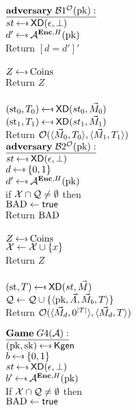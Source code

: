 \begin{figure}[tbhp]
\begin{center}
{
 {$\adversaryv{\;\advB1^{\mathcal{O}}(\pk)}$}\\
$st \getsr \mdalg(\epsilon,\bot)$\\
$d' \getsr \advA^{\encOracle,H}(\pk)$\\
Return $[d=d']'$\\ 

\\
  $Z \getsr \mathrm{Coins}$\\
  Return $Z$\\

\\
$(\st_0, \umd_0) \getsr \mdalg(st_0,\vmsg_0)$\\
$(\st_1, \umd_1) \getsr \mdalg(st_1,\vmsg_1)$\\
Return $\mathcal{O}(\langle \vec{M}_0,T_0\rangle, \langle \vec{M}_1,T_1\rangle)$\\
}
{
{$\adversaryv{\;\advB2^{\mathcal{O}}(\pk)}$}\\
$st \getsr \mdalg(\epsilon,\bot)$\\
$d \getsr \bits$\\ 
$d' \getsr \advA^{\encOracle,H}(\pk)$\\
if $\mathcal{X} \cap \mathcal{Q} \neq \emptyset$ then\\
\nudge $\mathrm{BAD}\gets\textsf{true}$\\
Return $\mathrm{BAD}$\\ 

\\
  $Z \getsr \mathrm{Coins}$\\
  $\mathcal{X} \gets \mathcal{X} \cup \{x\}$\\
  Return $Z$\\

\\
$(\st, \umd) \getsr \mdalg(st,\vmsg)$\\
$\mathcal{Q} \gets \mathcal{Q} \cup \{\langle \mathrm{pk},\vec{A},\vec{M}_b,T\rangle\}$\\
Return $\mathcal{O}(\langle \vec{M}_d,0^{|T|}\rangle, \langle \vec{M}_d,T\rangle)$\\
}
{
$\gamev{G4}{\advA}$\\
 $(\pk,\sk)\getsr\Kgen$\\
$ b \getsr \bits$\\
 $st \getsr \mdalg(\epsilon,\bot)$\\
 $b' \getsr \advA^{\encOracle,H}(\pk)$\\
 If $\mathcal{X} \cap \mathcal{Q} \neq \emptyset$ then \\
\nudge $\mathrm{BAD}\gets\textsf{true}$

}
\end{center}
\end{figure}
